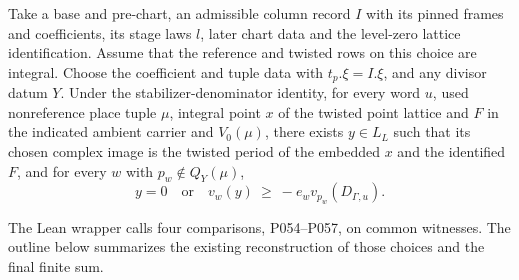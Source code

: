 
\begin{formalstatement}\label{pn:P048}
Take a base and pre-chart, an admissible column record \(I\) with its pinned frames and coefficients, its stage laws \(l\), later chart data and the level-zero lattice identification. Assume that the reference and twisted rows on this choice are integral. Choose the coefficient and tuple data with \(t_p.\xi=I.\xi\), and any divisor datum \(Y\). Under the stabilizer-denominator identity, for every word \(u\), used nonreference place tuple \(\mu\), integral point \(x\) of the twisted point lattice and \(F\) in the indicated ambient carrier and \(V_0(\mu)\), there exists \(y\in L_L\) such that its chosen complex image is the twisted period of the embedded \(x\) and the identified \(F\), and for every \(w\) with \(p_w\notin Q_Y(\mu)\),
\[
       y=0\quad\text{or}\quad v_w(y)\ \ge\ -e_w v_{p_w}(D_{\Gamma,u}).
\]
\end{formalstatement}
The Lean wrapper calls four comparisons, P054--P057, on common witnesses. The outline below summarizes the existing reconstruction of those choices and the final finite sum.
